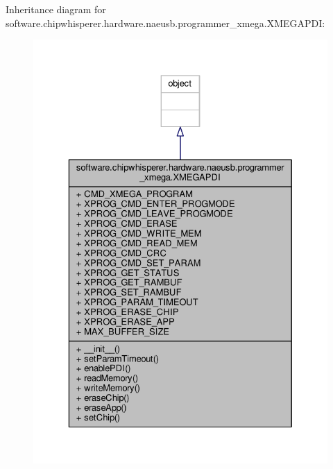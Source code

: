 Inheritance diagram for software.\+chipwhisperer.\+hardware.\+naeusb.\+programmer\+\_\+xmega.\+X\+M\+E\+G\+A\+P\+D\+I\+:\nopagebreak
\begin{figure}[H]
\begin{center}
\leavevmode
\includegraphics[width=329pt]{dc/dff/classsoftware_1_1chipwhisperer_1_1hardware_1_1naeusb_1_1programmer__xmega_1_1XMEGAPDI__inherit__graph}
\end{center}
\end{figure}


